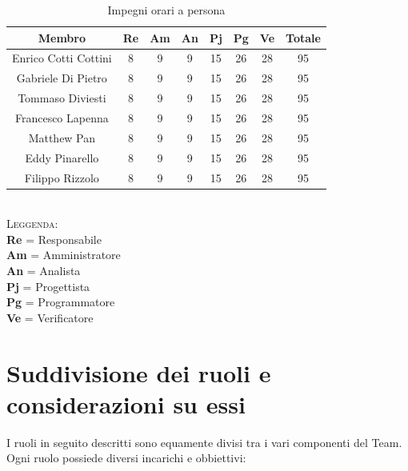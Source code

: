 \documentclass{article}
\begin{document}
\begin{table}[!h]
	\begin{center}
		\begin{tabular}{ |c|c|c|c|c|c|c|c| }
			\hline
			\textbf{Membro}    & \textbf{Re} & \textbf{Am} & \textbf{An} & \textbf{Pj} & \textbf{Pg} & \textbf{Ve} & \textbf{Totale} \\
			\hline
			Enrico Cotti Cottini     & 8           & 9           & 9          & 15          & 26          & 28          & 95              \\
			Gabriele Di Pietro       & 8           & 9           & 9          & 15          & 26          & 28          & 95              \\
			Tommaso Diviesti         & 8           & 9           & 9          & 15          & 26          & 28          & 95              \\
			Francesco Lapenna        & 8           & 9           & 9          & 15          & 26          & 28          & 95              \\
			Matthew Pan              & 8           & 9           & 9          & 15          & 26          & 28          & 95              \\
			Eddy Pinarello           & 8           & 9           & 9          & 15          & 26          & 28          & 95              \\
			Filippo Rizzolo          & 8           & 9           & 9          & 15          & 26          & 28          & 95              \\
			\hline
		\end{tabular}
        \caption{Impegni orari a persona} 
    \end{center}
\end{table}
\\
\textsc{Leggenda:} \\
    \textbf{Re} = Responsabile \\
    \textbf{Am} = Amministratore \\
    \textbf{An} = Analista \\
    \textbf{Pj} = Progettista \\
    \textbf{Pg} = Programmatore \\
    \textbf{Ve} = Verificatore \\
    
\newpage

\section{Suddivisione dei ruoli e considerazioni su essi}
I ruoli in seguito descritti sono equamente divisi tra i vari componenti del Team. Ogni ruolo possiede diversi incarichi e obbiettivi:
\end{document}
